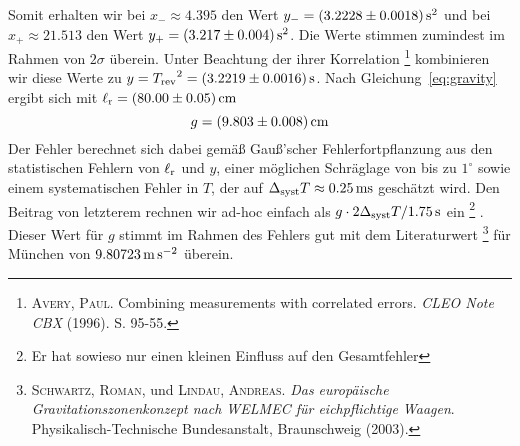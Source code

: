 Somit erhalten wir bei $x_- \approx 4.395$ den Wert $y_- = \unit[(3.2228 \pm 0.0018)]{s^2}$ und bei $x_+ \approx 21.513$ den Wert $y_+ = \unit[(3.217 \pm 0.004)]{s^2}$. Die Werte stimmen zumindest im Rahmen von $2 \sigma$ überein. Unter Beachtung der ihrer Korrelation%
\footnote{\textsc{Avery, Paul}. Combining measurements with correlated errors. \textit{CLEO Note CBX} (1996). S. 95-55.}
kombinieren wir diese Werte zu $y = {T_\mathrm{rev}}^2 = \unit[(3.2219 \pm 0.0016)]{s}$.
Nach Gleichung~\ref{eq:gravity} ergibt sich mit $\l_\mathrm{r} = \unit[(80.00 \pm 0.05)]{cm}$
\[
    g = \unit[(9.803 \pm 0.008)]{cm}
\]
Der Fehler berechnet sich dabei gemäß Gauß'scher Fehlerfortpflanzung aus den statistischen Fehlern von $\ell_\mathrm{r}$ und $y$, einer möglichen Schräglage von bis zu $1^\circ$ sowie einem systematischen Fehler in $T$, der auf $\Delta_\mathrm{syst} T \approx \unit[0.25]{ms}$ geschätzt wird. Den Beitrag von letzterem rechnen wir ad-hoc einfach als $g \cdot 2 \Delta_\mathrm{syst} T / \unit[1.75]{s}$ ein%
\footnote{Er hat sowieso nur einen kleinen Einfluss auf den Gesamtfehler}%
. Dieser Wert für $g$ stimmt im Rahmen des Fehlers gut mit dem Literaturwert%
\footnote{\textsc{Schwartz, Roman}, und \textsc{Lindau, Andreas}. \textit{Das europäische Gravitationszonenkonzept nach WELMEC für eichpflichtige Waagen}. Physikalisch-Technische Bundesanstalt, Braunschweig (2003).}
für München von $\unit[9.80723]{m\,s^{-2}}$ überein.

\setlength{\parindent}{0pt}